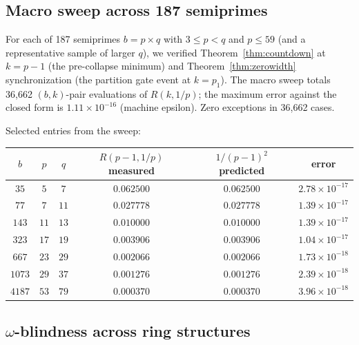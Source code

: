 \documentclass[11pt,reqno]{amsart}
\theoremstyle{plain}
\theoremstyle{definition}
\theoremstyle{remark}
\begin{document}
\subsection{Macro sweep across 187 semiprimes}

For each of 187 semiprimes $b = p \times q$ with $3 \le p < q$ and
$p \le 59$ (and a representative sample of larger $q$), we
verified Theorem~\ref{thm:countdown} at $k = p - 1$ (the
pre-collapse minimum) and Theorem~\ref{thm:zerowidth}
synchronization (the partition gate event at $k = p_1$). The
macro sweep totals 36{,}662 $(b, k)$-pair evaluations of $R(k, 1/p)$;
the maximum error against the closed form is $1.11 \times 10^{-16}$
(machine epsilon). Zero exceptions in 36{,}662 cases.

Selected entries from the sweep:
\begin{center}
\begin{tabular}{c|c|c|c|c|c}
\toprule
$b$ & $p$ & $q$ & $R(p-1, 1/p)$ measured & $1/(p-1)^2$ predicted & error \\
\midrule
$35$   & $5$  & $7$  & $0.062500$ & $0.062500$ & $2.78 \times 10^{-17}$ \\
$77$   & $7$  & $11$ & $0.027778$ & $0.027778$ & $1.39 \times 10^{-17}$ \\
$143$  & $11$ & $13$ & $0.010000$ & $0.010000$ & $1.39 \times 10^{-17}$ \\
$323$  & $17$ & $19$ & $0.003906$ & $0.003906$ & $1.04 \times 10^{-17}$ \\
$667$  & $23$ & $29$ & $0.002066$ & $0.002066$ & $1.73 \times 10^{-18}$ \\
$1073$ & $29$ & $37$ & $0.001276$ & $0.001276$ & $2.39 \times 10^{-18}$ \\
$4187$ & $53$ & $79$ & $0.000370$ & $0.000370$ & $3.96 \times 10^{-18}$ \\
\bottomrule
\end{tabular}
\end{center}

\subsection{$\omega$-blindness across ring structures}
\end{document}
